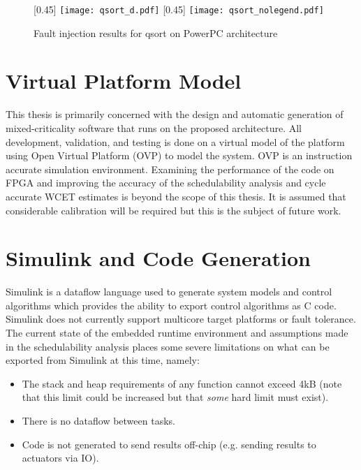 	
	
\begin{figure}
\centering
{}[0.45\textwidth]
{	
    \texttt{[image: qsort\_d.pdf]}
}%
\hfill
{}[0.45\textwidth]
{
    \texttt{[image: qsort\_nolegend.pdf]}
}%
\caption{Fault injection results for qsort on PowerPC architecture}
\label{f:ft-arch}
\end{figure}
\section{Virtual Platform Model}

	This thesis is primarily concerned with the design and automatic generation of mixed-criticality software that runs on the proposed architecture. 
	All development, validation, and testing is done on a virtual model of the platform using Open Virtual Platform (OVP) to model the system. OVP is an instruction accurate simulation environment. 
	Examining the performance of the code on FPGA and improving the accuracy of the schedulability analysis and cycle accurate WCET estimates is beyond the scope of this thesis. 
	It is assumed that considerable calibration will be required but this is the subject of future work.

\section{Simulink and Code Generation}

	Simulink is a dataflow language used to generate system models and control algorithms which provides the ability to export control algorithms as C code. 
	Simulink does not currently support multicore target platforms or fault tolerance. 
	The current state of the embedded runtime environment and assumptions made in the schedulability analysis places some severe limitations on what can be exported from Simulink at this time, namely:
\begin{itemize}
  \item The stack and heap requirements of any function cannot exceed 4kB (note that this limit could be increased but that \emph{some} hard limit must exist).
  \item There is no dataflow between tasks.
  \item Code is not generated to send results off-chip (e.g. sending results to actuators via IO).
\end{itemize}




